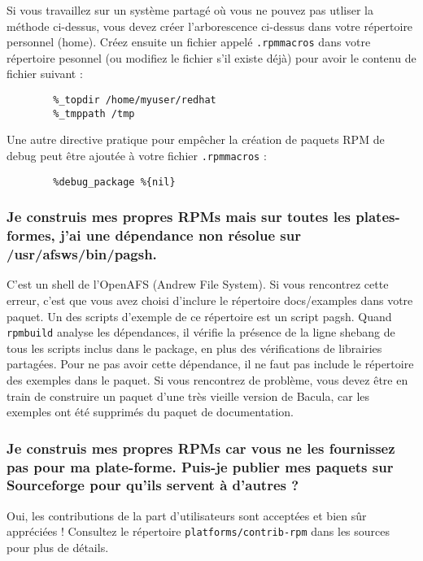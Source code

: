 Si vous travaillez sur un système partagé où vous ne pouvez pas utliser la 
méthode ci-dessus, vous devez créer l'arborescence ci-dessus dans votre 
répertoire personnel (home).  Créez ensuite un fichier appelé {\tt .rpmmacros} 
dans votre répertoire pesonnel (ou modifiez le fichier s'il existe déjà) pour
avoir le contenu de fichier suivant :

\footnotesize
\begin{verbatim}
        %_topdir /home/myuser/redhat
        %_tmppath /tmp
\end{verbatim}
\normalsize

Une autre directive pratique pour empêcher la création de paquets RPM de debug
peut être ajoutée à votre fichier {\tt .rpmmacros} :

\footnotesize
\begin{verbatim}
        %debug_package %{nil}
\end{verbatim}
\normalsize

   
   \subsubsection{Je construis mes propres RPMs mais sur toutes les 
   plates-formes, j'ai une dépendance non résolue sur /usr/afsws/bin/pagsh.}
   C'est un shell de l'OpenAFS (Andrew File System).  Si vous rencontrez cette
   erreur, c'est que vous avez choisi d'inclure le répertoire docs/examples dans
   votre paquet. Un des scripts d'exemple de ce répertoire est un script pagsh.
   Quand {\tt rpmbuild} analyse les dépendances, il vérifie la présence de la
   ligne shebang de tous les scripts inclus dans le package, en plus des 
   vérifications de librairies partagées. Pour ne pas avoir cette dépendance, il
   ne faut pas include le répertoire des exemples dans le paquet. Si vous 
   rencontrez de problème, vous devez être en train de construire un paquet
   d'une très vieille version de Bacula, car les exemples ont été supprimés du
   paquet de documentation.
      
   \subsubsection{Je construis mes propres RPMs car vous ne les fournissez pas
   pour ma plate-forme. Puis-je publier mes paquets sur Sourceforge pour qu'ils
   servent à d'autres ?}
   Oui, les contributions de la part d'utilisateurs sont acceptées et bien sûr
   appréciées ! Consultez le répertoire \texttt{platforms/contrib-rpm} dans les
   sources pour plus de détails.

